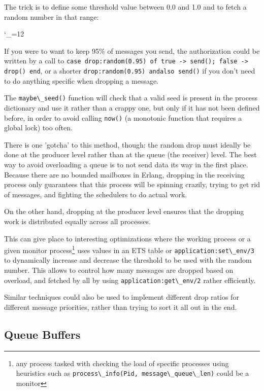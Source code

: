 \documentclass[11pt, oneside]{book}   	%
\newcommand{\function}[1]{\Verb`#1`}
\newcommand{\expression}[1]{\Verb`#1`}
\def\includecode{\begingroup
\catcode`\_=12
\includecodeB}
\newcommand{\includecodeB}[2][erlang]{\VerbatimInput[frame=single,label=#1/#2,fontsize=\small]{#1/#2}\endgroup}
\begin{document}
The trick is to define some threshold value between 0.0 and 1.0 and to fetch a random number in that range:

\includecode[erlang]{drop.erl}

If you were to want to keep 95\% of messages you send, the authorization could be written by a call to \expression{case drop:random(0.95) of true -> send(); false -> drop() end}, or a shorter \expression{drop:random(0.95) andalso send()} if you don't need to do anything specific when dropping a message. 

The \function{maybe\_seed()} function will check that a valid seed is present in the process dictionary and use it rather than a crappy one, but only if it has not been defined before, in order to avoid calling \function{now()} (a monotonic function that requires a global lock) too often.

There is one 'gotcha' to this method, though: the random drop must ideally be done at the producer level rather than at the queue (the receiver) level. The best way to avoid overloading a queue is to not send data its way in the first place. Because there are no bounded mailboxes in Erlang, dropping in the receiving process only guarantees that this process will be spinning crazily, trying to get rid of messages, and fighting the schedulers to do actual work.

On the other hand, dropping at the producer level ensures that the dropping work is distributed equally across all processes.

This can give place to interesting optimizations where the working process or a given monitor process\footnote{any process tasked with checking the load of specific processes using heuristics such as \expression{process\_info(Pid, message\_queue\_len)} could be a monitor} uses values in an ETS table or \function{application:set\_env/3} to dynamically increase and decrease the threshold to be used with the random number. This allows to control how many messages are dropped based on overload, and fetched by all by using \function{application:get\_env/2} rather efficiently.

Similar techniques could also be used to implement different drop ratios for different message priorities, rather than trying to sort it all out in the end. 

\subsection{Queue Buffers}
\end{document}
